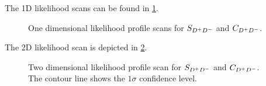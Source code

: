 The 1D likelihood scans can be found in \cref{fig:b02dd:decaytimefit:1DLLScan}.
\begin{figure}[!htb]
\centering
\caption{One dimensional likelihood profile scans for $S_{{{D}^+}{{D}^-}}$ and $C_{{{D}^+}{{D}^-}}$.}
\label{fig:b02dd:decaytimefit:1DLLScan}
\end{figure}

The 2D likelihood scan is depicted in \cref{fig:b02dd:decaytimefit:2DLLScan}.
\begin{figure}[!htb]
\centering
\caption{Two dimensional likelihood profile scan for $S_{{{D}^+}{{D}^-}}$ and $C_{{{D}^+}{{D}^-}}$.
The contour line shows the $1\sigma$ confidence level.}
\label{fig:b02dd:decaytimefit:2DLLScan}
\end{figure}

\FloatBarrier
